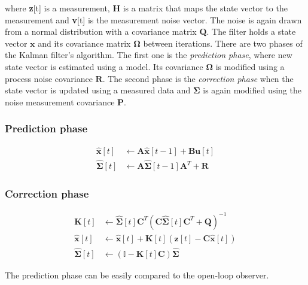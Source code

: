 where \textbf{z}[t] is a measurement, \textbf{H} is a matrix that maps the state vector to the measurement and \textbf{v}[t] is the measurement noise vector. The noise is again drawn from a normal distribution with a covariance matrix \textbf{Q}. The filter holds a state vector $\textbf{\^x}$ and its covariance matrix $\boldsymbol{\Omega}$ between iterations. There are two phases of the Kalman filter's algorithm. The first one is the \textit{prediction phase}, where new state vector is estimated using a model. Its covariance $\boldsymbol{\Omega}$ is modified using a process noise covariance $\textbf{R}$. The second phase is the \textit{correction phase} when the state vector is updated using a measured data and $\boldsymbol{\Sigma}$ is again modified using the noise measurement covariance \textbf{P}.      

\subsubsection*{Prediction phase}

\begin{equation}
\begin{split}
\hat{\textbf{x}}[t] &\leftarrow \textbf{A}\hat{\textbf{x}}[t-1] + \textbf{B}\textbf{u}[t] \\
\hat{\boldsymbol{\Sigma}}[t] &\leftarrow \textbf{A}\hat{\boldsymbol{\Sigma}}[t-1]\textbf{A}^{T} + \textbf{R}
\end{split}
\end{equation}

\subsubsection*{Correction phase}

\begin{equation}
\begin{split}
\textbf{K}[t] &\leftarrow \hat{\boldsymbol{\Sigma}}[t]\textbf{C}^{T}\left(\textbf{C}\hat{\boldsymbol{\Sigma}}[t]\textbf{C}^{T} + \textbf{Q}\right)^{-1} \\
\hat{\textbf{x}}[t] &\leftarrow \hat{\textbf{x}}[t] + \textbf{K}[t]\left(\textbf{z}[t] - \textbf{C}\hat{\textbf{x}}[t]\right) \\
\hat{\boldsymbol{\Sigma}}[t] &\leftarrow \left(\mathbb{I} - \textbf{K}[t]\textbf{C}\right)\hat{\boldsymbol{\Sigma}}
\end{split}
\end{equation}

The prediction phase can be easily compared to the open-loop observer. 